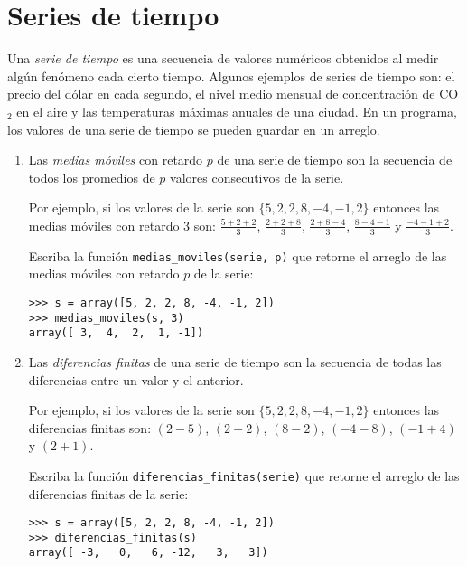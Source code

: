 \section{Series de tiempo}


Una \emph{serie de tiempo} es una secuencia de valores numéricos
obtenidos al medir algún fenómeno cada cierto tiempo. Algunos ejemplos
de series de tiempo son: el precio del dólar en cada segundo, el nivel
medio mensual de concentración de CO\({}_2\) en el aire y las temperaturas
máximas anuales de una ciudad. En un programa, los valores de una serie
de tiempo se pueden guardar en un arreglo.

\begin{enumerate}
\item
  Las \emph{medias móviles} con retardo \(p\) de una serie de tiempo
  son la secuencia de todos los promedios de \(p\) valores consecutivos
  de la serie.

  Por ejemplo, si los valores de la serie son \(\{5, 2, 2, 8, -4, -1, 2\}\)
  entonces las medias móviles con retardo 3 son:
  \(\frac{5 + 2 + 2}{3}\),
  \(\frac{2 + 2 + 8}{3}\),
  \(\frac{2 + 8 - 4}{3}\),
  \(\frac{8 - 4 - 1}{3}\) y
  \(\frac{-4 -1 + 2}{3}\).

    Escriba la función \lstinline!medias_moviles(serie, p)! que retorne el
    arreglo de las medias móviles con retardo \(p\) de la serie:

\begin{lstlisting}
>>> s = array([5, 2, 2, 8, -4, -1, 2])
>>> medias_moviles(s, 3)
array([ 3,  4,  2,  1, -1])
\end{lstlisting}
\item
  Las \emph{diferencias finitas} de una serie de tiempo son la
  secuencia de todas las diferencias entre un valor y el anterior.

  Por ejemplo, si los valores de la serie son
  \(\{5, 2, 2, 8, -4, -1, 2\}\)
  entonces las diferencias finitas son:
  \((2 - 5)\),
  \((2 - 2)\),
  \((8 - 2)\),
  \((-4 - 8)\),
  \((-1 + 4)\) y
  \((2 + 1)\).

  Escriba la función \lstinline!diferencias_finitas(serie)! que retorne
  el arreglo de las diferencias finitas de la serie:

\begin{lstlisting}
>>> s = array([5, 2, 2, 8, -4, -1, 2])
>>> diferencias_finitas(s)
array([ -3,   0,   6, -12,   3,   3])
\end{lstlisting}
\end{enumerate}
